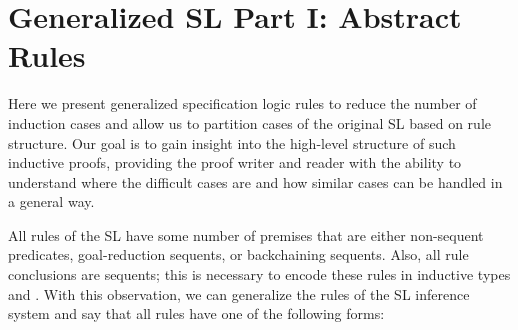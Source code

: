 




\section{Generalized SL Part I: Abstract Rules}
\label{sec:gsl}

Here we present generalized specification logic rules to reduce the number of induction cases and allow us to partition cases of the original SL based on rule structure. Our goal is to gain insight into the high-level structure of such inductive proofs, providing the proof writer and reader with the ability to understand where the difficult cases are and how similar cases can be handled in a general way.

All rules of the SL have some number of premises that are either non-sequent predicates, goal-reduction sequents, or backchaining sequents. Also, all rule conclusions are sequents; this is necessary to encode these rules in inductive types  and . With this observation, we can generalize the rules of the SL inference system and say that all rules have one of the following forms:

